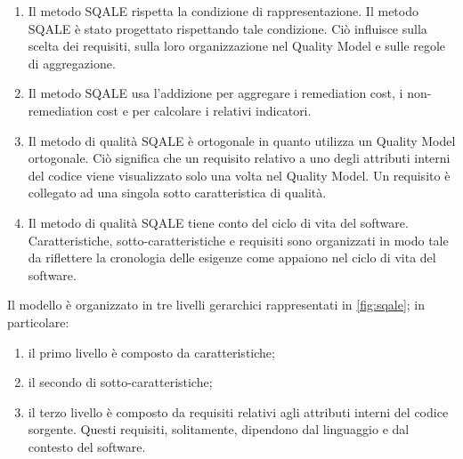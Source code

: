 \begin{enumerate}
	\item Il metodo SQALE rispetta la condizione di rappresentazione. Il metodo SQALE è stato progettato rispettando tale condizione. Ciò influisce sulla scelta dei requisiti, sulla loro organizzazione nel Quality Model e sulle regole di aggregazione.
	\item Il metodo SQALE usa l’addizione per aggregare i remediation cost, i non-remediation cost e per calcolare i relativi indicatori.
	\item Il metodo di qualità SQALE è ortogonale in quanto utilizza un Quality Model ortogonale. Ciò significa che un requisito relativo a uno degli attributi interni del codice viene visualizzato solo una volta nel Quality Model. Un requisito è collegato ad una singola sotto caratteristica di qualità.
	\item Il metodo di qualità SQALE tiene conto del ciclo di vita del software. Caratteristiche, sotto-caratteristiche e requisiti sono organizzati in modo tale da riflettere la cronologia delle esigenze come appaiono nel ciclo di vita del software.
\end{enumerate}
%
%

Il modello è organizzato in tre livelli gerarchici rappresentati in \autoref{fig:sqale}; in particolare:
\begin{enumerate}
	\item il primo livello è composto da caratteristiche;
	\item il secondo di sotto-caratteristiche;
	\item il terzo livello è composto da requisiti relativi agli attributi interni del codice sorgente. Questi requisiti, solitamente, dipendono dal linguaggio e dal contesto del software.
\end{enumerate}

